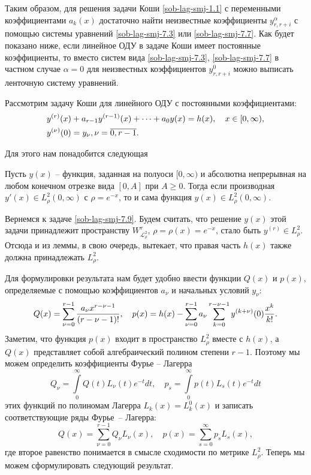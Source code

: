 Таким образом, для решения задачи Коши \eqref{sob-lag-smj-1.1} с переменными коэффициентами $a_k(x)$ достаточно найти неизвестные коэффициенты $y^\alpha_{r,r+i}$ с помощью системы уравнений \eqref{sob-lag-smj-7.3} или \eqref{sob-lag-smj-7.7}. Как будет показано ниже, если линейное ОДУ в задаче Коши имеет постоянные коэффициенты, то вместо систем вида \eqref{sob-lag-smj-7.3}, \eqref{sob-lag-smj-7.7} в частном случае $\alpha=0$ для неизвестных коэффициентов $y^0_{r,r+i}$ можно выписать ленточную систему уравнений.

Рассмотрим задачу Коши для линейного ОДУ с постоянными коэффициентами:
\begin{align}\label{sob-lag-smj-7.9}
    &y^{(r)}(x)+a_{r-1}y^{(r-1)}(x)+\cdots+a_0y(x)=h(x), \quad x \in [0, \infty),\\
    &y^{(\nu)}(0)=y_\nu, \nu =\overline{0, r-1}.\notag
\end{align}

Для этого нам понадобится следующая
\begin{lemma}
Пусть $y(x)$ -- функция, заданная на полуоси $[0,\infty)$ и абсолютна непрерывная на любом конечном отрезке вида $[0,A]$ при $A \ge 0$. Тогда если производная $y'(x) \in L^2_\rho(0,\infty)$ с $\rho=e^{-x}$, то и сама функция $y(x) \in L^2_\rho(0,\infty)$.
\end{lemma}

Вернемся к задаче \eqref{sob-lag-smj-7.9}. Будем считать, что решение $y(x)$ этой задачи принадлежит пространству $W^{r}_{\mathcal{L}_{\rho}^2}$, $\rho = \rho(x) = e^{-x}$, стало быть $y^{(r)} \in L^2_\rho$. Отсюда и из леммы, в свою очередь, вытекает, что правая часть $h(x)$ также должна принадлежать $L^2_\rho$.

Для формулировки результата нам будет удобно ввести функции $Q(x)$ и $p(x)$, определяемые с помощью коэффициентов $a_\nu$ и начальных условий $y_\nu$:
\begin{equation}\label{sob-lag-smj-Q-and-p}
Q(x)=\sum_{\nu=0}^{r-1}{a_\nu x^{r-\nu-1}\over (r-\nu-1)!}, \quad
p(x)=h(x)-\sum_{\nu=0}^{r-1}a_\nu\sum_{k=0}^{r-\nu-1} y^{(k+\nu)}(0)\frac{x^k}{k!}.
\end{equation}
Заметим, что функция $p(x)$ входит в пространство $L^2_\rho$ вместе с $h(x)$, а $Q(x)$ представляет собой алгебраический полином степени $r-1$. Поэтому мы можем определить коэффициенты Фурье -- Лагерра
\begin{equation}\label{sob-lag-smj-laguerre-coeffs}
Q_\nu = \int\limits_{0}^{\infty} Q(t)L_\nu(t)e^{-t}dt, \quad
p_s = \int\limits_{0}^{\infty} p(t)L_s(t)e^{-t}dt
\end{equation}
этих функций по полиномам Лагерра $L_k(x)=L_k^0(x)$ и записать соответствующие ряды Фурье~-- Лагерра:
\begin{equation*}
Q(x)=\sum_{\nu=0}^{r-1}Q_\nu L_\nu(x), \quad
p(x)=\sum_{s=0}^\infty p_sL_s(x),
\end{equation*}
где второе равенство понимается в смысле сходимости по метрике $L^2_\rho$. Теперь мы можем сформулировать следующий результат.

